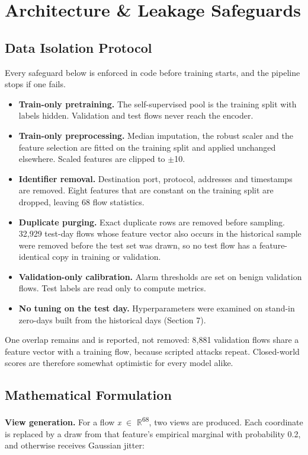 \documentclass[10pt,a4paper]{article}
\begin{document}
\section{Architecture \& Leakage Safeguards}
\subsection{Data Isolation Protocol}
Every safeguard below is enforced in code before training starts, and the pipeline stops if one fails.

\begin{itemize}
\item \textbf{Train-only pretraining.} The self-supervised pool is the training split with labels hidden. Validation and test flows never reach the encoder.
\item \textbf{Train-only preprocessing.} Median imputation, the robust scaler and the feature selection are fitted on the training split and applied unchanged elsewhere. Scaled features are clipped to $\pm$10.
\item \textbf{Identifier removal.} Destination port, protocol, addresses and timestamps are removed. Eight features that are constant on the training split are dropped, leaving 68 flow statistics.
\item \textbf{Duplicate purging.} Exact duplicate rows are removed before sampling. 32,929 test-day flows whose feature vector also occurs in the historical sample were removed before the test set was drawn, so no test flow has a feature-identical copy in training or validation.
\item \textbf{Validation-only calibration.} Alarm thresholds are set on benign validation flows. Test labels are read only to compute metrics.
\item \textbf{No tuning on the test day.} Hyperparameters were examined on stand-in zero-days built from the historical days (Section 7).
\end{itemize}
One overlap remains and is reported, not removed: 8,881 validation flows share a feature vector with a training flow, because scripted attacks repeat. Closed-world scores are therefore somewhat optimistic for every model alike.

\subsection{Mathematical Formulation}
\textbf{View generation.} For a flow \textit{x} $\in$ $\mathbb{R}$\textsuperscript{68}, two views are produced. Each coordinate is replaced by a draw from that feature's empirical marginal with probability 0.2, and otherwise receives Gaussian jitter:
\end{document}
